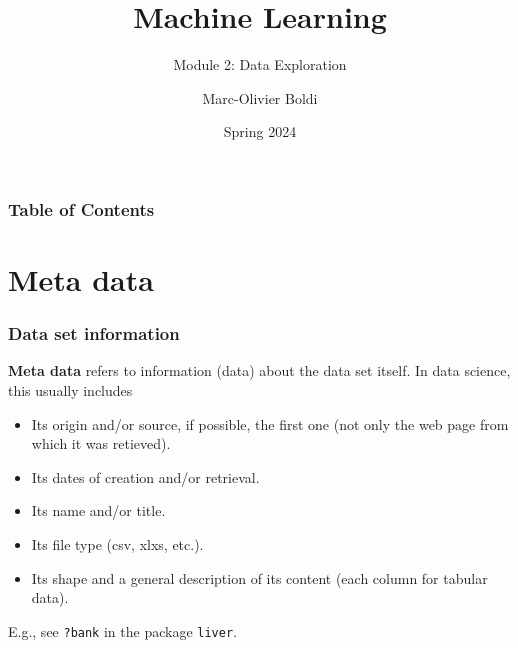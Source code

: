 
\title{Machine Learning}
\subtitle{Module 2: Data Exploration}
\author[MOB]{Marc-Olivier Boldi}
\date[Spring 2024]{Spring 2024}

\begin{frame}
	\titlepage
\end{frame}
\begin{frame}
\frametitle{Table of Contents}
	\tableofcontents
\end{frame}
\section{Meta data}
\begin{frame}
\frametitle{Data set information}
{\bf Meta data} refers to information (data) about the data set itself. In data science, this usually includes
\begin{itemize}
\item Its origin and/or source, if possible, the first one (not only the web page from which it was retieved).
\item Its dates of creation and/or retrieval.
\item Its name and/or title.
\item Its file type (csv, xlxs, etc.).
\item Its shape and a general description of its content (each column for tabular data).
\end{itemize}
E.g., see {\tt ?bank} in the package {\tt liver}. 
\end{frame}
